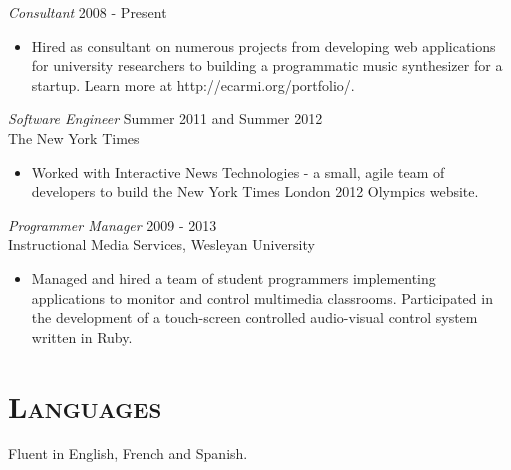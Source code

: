 \documentclass[margin]{res}
\begin{document}
\begin{resume}
    {\sl Consultant} \hfill 2008 - Present
    \begin{itemize}  \itemsep -2pt %
        \item Hired as consultant on numerous projects from developing web applications for university researchers to building a programmatic music synthesizer for a startup. Learn more at http://ecarmi.org/portfolio/.
    \end{itemize}

    {\sl Software Engineer} \hfill Summer 2011 and Summer 2012 \\
    The New York Times
    \begin{itemize}  \itemsep -2pt %
        \item Worked with Interactive News Technologies - a small, agile team of developers to build the New York Times London 2012 Olympics website.
    \end{itemize}

    {\sl Programmer Manager} \hfill 2009 - 2013 \\
    Instructional Media Services, Wesleyan University
    \begin{itemize}  \itemsep -2pt %
        \item Managed and hired a team of student programmers implementing applications to monitor and control multimedia classrooms. Participated in the development of a touch-screen controlled audio-visual control system written in Ruby.
    \end{itemize}

\section{\textsc{Languages}} Fluent in English, French and Spanish.

\end{resume}
\end{document}
